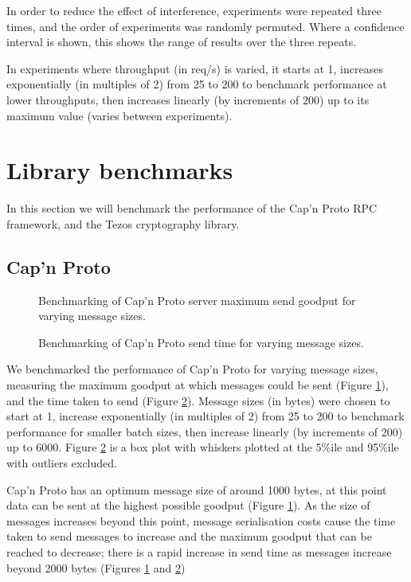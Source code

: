 In order to reduce the effect of interference, experiments were repeated three times, and the order of experiments was randomly permuted. Where a confidence interval is shown, this shows the range of results over the three repeats.

In experiments where throughput (in req/s) is varied, it starts at 1, increases exponentially (in multiples of 2) from 25 to 200 to benchmark performance at lower throughputs, then increases linearly (by increments of 200) up to its maximum value (varies between experiments).

\section{Library benchmarks} \label{librarybenchmarks}
In this section we will benchmark the performance of the Cap'n Proto RPC framework, and the Tezos cryptography library.

\subsection{Cap'n Proto} \label{capnpbenchmark}

\begin{figure}[h!]
\centering
\resizebox{.6\textwidth}{!}{}
\caption{Benchmarking of Cap'n Proto server maximum send goodput for varying message sizes.}
\label{sizegoodput}
\end{figure}

\begin{figure}[h!]
\centering
\resizebox{.6\textwidth}{!}{}
\caption{Benchmarking of Cap'n Proto send time for varying message sizes.}
\label{sizesendtime}
\end{figure}

We benchmarked the performance of Cap'n Proto \cite{capnp} for varying message sizes, measuring the maximum goodput at which messages could be sent (Figure \ref{sizegoodput}), and the time taken to send (Figure \ref{sizesendtime}). Message sizes (in bytes) were chosen to start at 1, increase exponentially (in multiples of 2) from 25 to 200 to benchmark performance for smaller batch sizes, then increase linearly (by increments of 200) up to 6000. Figure \ref{sizesendtime} is a box plot with whiskers plotted at the 5\%ile and 95\%ile with outliers excluded.

Cap'n Proto has an optimum message size of around 1000 bytes, at this point data can be sent at the highest possible goodput (Figure \ref{sizegoodput}). As the size of messages increases beyond this point, message serialisation costs cause the time taken to send messages to increase and the maximum goodput that can be reached to decrease; there is a rapid increase in send time as messages increase beyond 2000 bytes (Figures \ref{sizegoodput} and \ref{sizesendtime})

